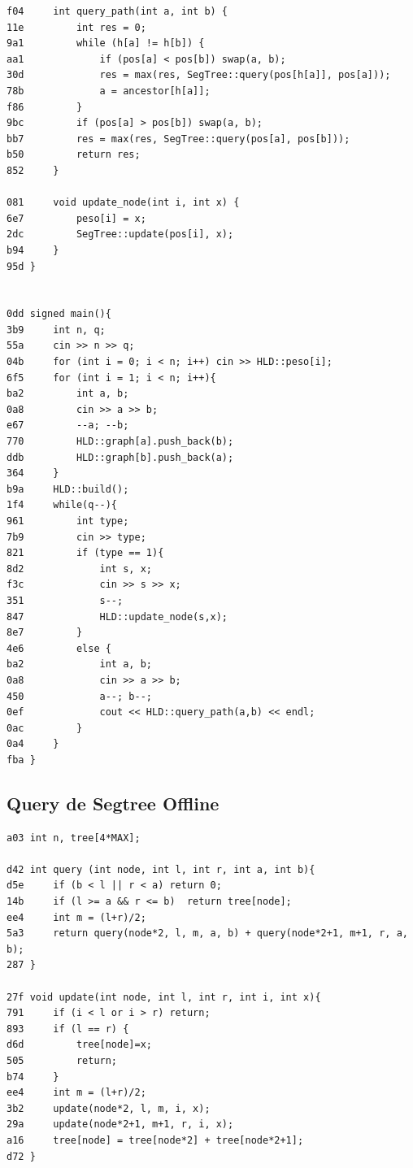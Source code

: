 \documentclass[11pt, a4paper, twoside]{article}
\begin{document}
{{\begin{lstlisting}
f04     int query_path(int a, int b) {
11e         int res = 0;
9a1         while (h[a] != h[b]) {
aa1             if (pos[a] < pos[b]) swap(a, b);
30d             res = max(res, SegTree::query(pos[h[a]], pos[a]));
78b             a = ancestor[h[a]];
f86         }
9bc         if (pos[a] > pos[b]) swap(a, b);
bb7         res = max(res, SegTree::query(pos[a], pos[b]));
b50         return res;
852     }
        
081     void update_node(int i, int x) {
6e7         peso[i] = x;
2dc         SegTree::update(pos[i], x);
b94     }
95d }


0dd signed main(){
3b9     int n, q;
55a     cin >> n >> q;
04b     for (int i = 0; i < n; i++) cin >> HLD::peso[i];
6f5     for (int i = 1; i < n; i++){
ba2         int a, b;
0a8         cin >> a >> b;
e67         --a; --b;
770         HLD::graph[a].push_back(b);
ddb         HLD::graph[b].push_back(a);
364     }
b9a     HLD::build();
1f4     while(q--){
961         int type;
7b9         cin >> type;
821         if (type == 1){
8d2             int s, x;
f3c             cin >> s >> x;
351             s--;
847             HLD::update_node(s,x);
8e7         }
4e6         else {
ba2             int a, b;
0a8             cin >> a >> b;
450             a--; b--;
0ef             cout << HLD::query_path(a,b) << endl;
0ac         }
0a4     }
fba }
\end{lstlisting}

\subsection{Query de Segtree Offline}
\begin{lstlisting}
a03 int n, tree[4*MAX];

d42 int query (int node, int l, int r, int a, int b){
d5e     if (b < l || r < a) return 0;
14b     if (l >= a && r <= b)  return tree[node];
ee4     int m = (l+r)/2; 
5a3     return query(node*2, l, m, a, b) + query(node*2+1, m+1, r, a, b);
287 }

27f void update(int node, int l, int r, int i, int x){
791     if (i < l or i > r) return;
893     if (l == r) {
d6d         tree[node]=x;
505         return;
b74     }
ee4     int m = (l+r)/2;
3b2     update(node*2, l, m, i, x);
29a     update(node*2+1, m+1, r, i, x);
a16     tree[node] = tree[node*2] + tree[node*2+1];
d72 }


\end{lstlisting}}}
\end{document}
